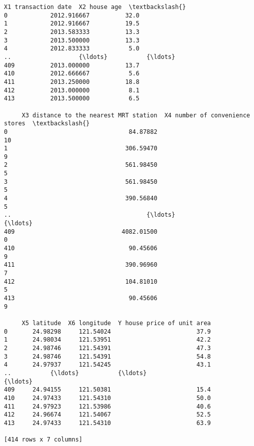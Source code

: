 \documentclass[11pt]{article}
\makeatletter
\newcommand{\boxspacing}{\kern\kvtcb@left@rule\kern\kvtcb@boxsep}
\newcommand{\prompt}[4]{
        {\ttfamily\llap{{\color{#2}[#3]:\hspace{3pt}#4}}\vspace{-\baselineskip}}
    }
\makeatother
\begin{document}
            \begin{tcolorbox}[breakable, size=fbox, boxrule=.5pt, pad at break*=1mm, opacityfill=0]
\prompt{Out}{outcolor}{210}{\boxspacing}
\begin{Verbatim}[commandchars=\\\{\}]
     X1 transaction date  X2 house age  \textbackslash{}
0            2012.916667          32.0
1            2012.916667          19.5
2            2013.583333          13.3
3            2013.500000          13.3
4            2012.833333           5.0
..                   {\ldots}           {\ldots}
409          2013.000000          13.7
410          2012.666667           5.6
411          2013.250000          18.8
412          2013.000000           8.1
413          2013.500000           6.5

     X3 distance to the nearest MRT station  X4 number of convenience stores  \textbackslash{}
0                                  84.87882                               10
1                                 306.59470                                9
2                                 561.98450                                5
3                                 561.98450                                5
4                                 390.56840                                5
..                                      {\ldots}                              {\ldots}
409                              4082.01500                                0
410                                90.45606                                9
411                               390.96960                                7
412                               104.81010                                5
413                                90.45606                                9

     X5 latitude  X6 longitude  Y house price of unit area
0       24.98298     121.54024                        37.9
1       24.98034     121.53951                        42.2
2       24.98746     121.54391                        47.3
3       24.98746     121.54391                        54.8
4       24.97937     121.54245                        43.1
..           {\ldots}           {\ldots}                         {\ldots}
409     24.94155     121.50381                        15.4
410     24.97433     121.54310                        50.0
411     24.97923     121.53986                        40.6
412     24.96674     121.54067                        52.5
413     24.97433     121.54310                        63.9

[414 rows x 7 columns]
\end{Verbatim}
\end{tcolorbox}
        
\end{document}
